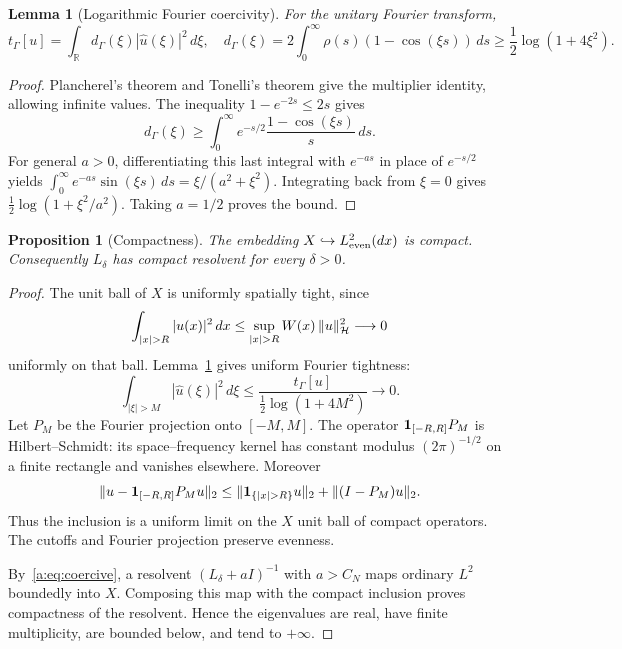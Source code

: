 \documentclass[11pt,a4paper]{article}
\numberwithin{equation}{section}
\newtheorem{proposition}[theorem]{Proposition}
\newtheorem{lemma}[theorem]{Lemma}
\theoremstyle{definition}\newtheorem{definition}[theorem]{Definition}
\theoremstyle{remark}\newtheorem{remark}[theorem]{Remark}
\newcommand{\R}{\mathbb R}\newcommand{\C}{\mathbb C}\newcommand{\N}{\mathbb N}
\newcommand{\Hh}{\mathcal H}\newcommand{\Hw}{\mathcal H}
\newcommand{\tg}{t_\Gamma}\newcommand{\cg}{c_\Gamma}
\begin{document}
\begin{lemma}[Logarithmic Fourier coercivity]\label{a:lem:fourier}
For the unitary Fourier transform,
\begin{equation}\label{a:eq:multiplier}
 \tg[u]=\int_\R d_\Gamma(\xi)|\widehat u(\xi)|^2\,d\xi,
 \quad
 d_\Gamma(\xi)=2\int_0^\infty\rho(s)(1-\cos(\xi s))\,ds
 \ge\frac12\log(1+4\xi^2).
\end{equation}
\end{lemma}
\begin{proof}
Plancherel's theorem and Tonelli's theorem give the multiplier identity, allowing infinite values. The inequality $1-e^{-2s}\le2s$ gives
\[
 d_\Gamma(\xi)\ge\int_0^\infty e^{-s/2}\frac{1-\cos(\xi s)}s\,ds.
\]
For general $a>0$, differentiating this last integral with $e^{-as}$ in place of $e^{-s/2}$ yields $\int_0^\infty e^{-as}\sin(\xi s)\,ds=\xi/(a^2+\xi^2)$. Integrating back from $\xi=0$ gives $\tfrac12\log(1+\xi^2/a^2)$. Taking $a=1/2$ proves the bound.
\end{proof}

\begin{proposition}[Compactness]\label{a:prop:compact}
The embedding $X\hookrightarrow L^2_{\mathrm{even}}(dx)$ is compact. Consequently $L_\delta$ has compact resolvent for every $\delta>0$.
\end{proposition}
\begin{proof}
The unit ball of $X$ is uniformly spatially tight, since
\begin{equation}\label{a:eq:spatialtight}
 \int_{|x|>R}|u(x)|^2\,dx
 \le\sup_{|x|>R}W(x)\,\norm{u}_{\Hh}^2\longrightarrow0
\end{equation}
uniformly on that ball. Lemma~\ref{a:lem:fourier} gives uniform Fourier tightness:
\begin{equation}\label{a:eq:fouriertight}
 \int_{|\xi|>M}|\widehat u(\xi)|^2\,d\xi
 \le\frac{\tg[u]}{\tfrac12\log(1+4M^2)}\longrightarrow0.
\end{equation}
Let $P_M$ be the Fourier projection onto $[-M,M]$. The operator
$\mathbf1_{[-R,R]}P_M$ is Hilbert--Schmidt: its space--frequency kernel has constant modulus $(2\pi)^{-1/2}$ on a finite rectangle and vanishes elsewhere. Moreover
\[
 \norm{u-\one_{[-R,R]}P_Mu}_2
 \le\norm{\one_{\{|x|>R\}}u}_2+\norm{(I-P_M)u}_2.
\]
Thus the inclusion is a uniform limit on the $X$ unit ball of compact operators. The cutoffs and Fourier projection preserve evenness.

By~\eqref{a:eq:coercive}, a resolvent $(L_\delta+aI)^{-1}$ with $a>C_N$ maps ordinary $L^2$ boundedly into $X$. Composing this map with the compact inclusion proves compactness of the resolvent. Hence the eigenvalues are real, have finite multiplicity, are bounded below, and tend to $+\infty$.
\end{proof}
\end{document}
